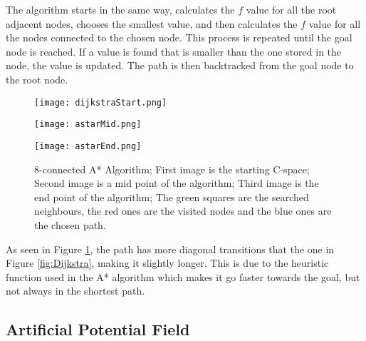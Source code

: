 The algorithm starts in the same way, calculates the $f$ value for all the root adjacent nodes, chooses the smallest value,
and then calculates the $f$ value for all the nodes connected to the chosen node. This process is repeated until the goal 
node is reached. If a value is found that is smaller than the one stored in the node, the value is updated. The path is then 
backtracked from the goal node to the root node.
\begin{figure}[htbp]
    \centering
    \begin{minipage}[b]{0.3\textwidth}
        \centering
        \texttt{[image: dijkstraStart.png]} %
    \end{minipage}
    \begin{minipage}[b]{0.3\textwidth}
        \centering
        \texttt{[image: astarMid.png]} %
    \end{minipage}
    \begin{minipage}[b]{0.3\textwidth}
        \centering
        \texttt{[image: astarEnd.png]} %
    \end{minipage}
    \caption{8-connected A* Algorithm; First image is the starting C-space; Second image is a mid point of the algorithm; Third image is the end point of the algorithm; The green squares are the searched neighbours, the red ones are the visited nodes and the blue ones are the chosen path.}
    \label{fig:A*}
\end{figure}

As seen in Figure \ref{fig:A*}, the path has more diagonal transitions that the one in 
Figure \ref{fig:Dijkstra}, making it slightly longer. This is due to the heuristic function used in the A* algorithm which 
makes it go faster towards the goal, but not always in the shortest path.

\subsection{Artificial Potential Field}
\label{subsec:APF}
